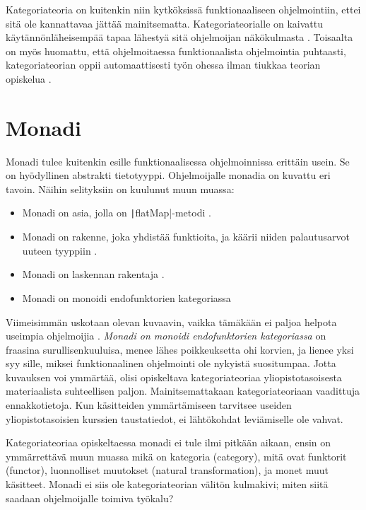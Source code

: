 Kategoriateoria on kuitenkin niin kytköksissä funktionaaliseen ohjelmointiin, ettei sitä ole kannattavaa jättää mainitsematta. Kategoriateorialle on kaivattu käytännönläheisempää tapaa lähestyä sitä ohjelmoijan näkökulmasta \cite{holvikari2021category}. Toisaalta on myös huomattu, että ohjelmoitaessa funktionaalista ohjelmointia puhtaasti, kategoriateorian oppii automaattisesti työn ohessa ilman tiukkaa teorian opiskelua \cite{holvikari2021category}.

\section{Monadi}

Monadi tulee kuitenkin esille funktionaalisessa ohjelmoinnissa erittäin usein. Se on hyödyllinen abstrakti tietotyyppi. Ohjelmoijalle monadia on kuvattu eri tavoin. Näihin selityksiin on kuulunut muun muassa:

\begin{itemize}
    \item Monadi on asia, jolla on \texttt|flatMap|-metodi \cite{stackoverflow_flatmap_monad}.
    \item Monadi on rakenne, joka yhdistää funktioita, ja käärii niiden palautusarvot uuteen tyyppiin \cite{monad_wikipedia}.
    \item Monadi on laskennan rakentaja \cite{stackoverflow_what_monad}.
    \item Monadi on monoidi endofunktorien kategoriassa \cite{bartosz_category_for_progamers_10,monad_wikipedia,stackoverflow_what_monad}
\end{itemize}


Viimeisimmän uskotaan olevan kuvaavin, vaikka tämäkään ei paljoa helpota useimpia ohjelmoijia \cite{stackoverflow_what_monad}. \textit{Monadi on monoidi endofunktorien kategoriassa} on fraasina surullisenkuuluisa, menee lähes poikkeuksetta ohi korvien, ja lienee yksi syy sille, miksei funktionaalinen ohjelmointi ole nykyistä suositumpaa. Jotta kuvauksen voi ymmärtää, olisi opiskeltava kategoriateoriaa yliopistotasoisesta materiaalista suhteellisen paljon. Mainitsemattakaan kategoriateoriaan vaadittuja ennakkotietoja.
Kun käsitteiden ymmärtämiseen tarvitsee useiden yliopistotasoisien kurssien taustatiedot, ei lähtökohdat leviämiselle ole vahvat.

Kategoriateoriaa opiskeltaessa monadi ei tule ilmi pitkään aikaan, ensin on ymmärrettävä muun muassa mikä on kategoria (category), mitä ovat funktorit (functor), luonnolliset muutokset (natural transformation), ja monet muut käsitteet. Monadi ei siis ole kategoriateorian välitön kulmakivi; miten siitä saadaan ohjelmoijalle toimiva työkalu?

